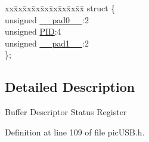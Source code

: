 \begin{DoxyCompactItemize}
\begin{tabbing}
\end{tabbing}\item 
\begin{tabbing}
xx\=xx\=xx\=xx\=xx\=xx\=xx\=xx\=xx\=\kill
struct \{\\
\>unsigned \hyperlink{union_b_d_stat_adf71f3d8410c1f1dbbc96680a92c49af}{\_\_pad0\_\_}:2\\
\>unsigned \hyperlink{union_b_d_stat_a97b41b25e06fd7857dcc6217c160a8ad}{PID}:4\\
\>unsigned \hyperlink{union_b_d_stat_acaf2d0924a107ec6e8d2e31febaf66f9}{\_\_pad1\_\_}:2\\
\}; \\

\end{tabbing}\end{DoxyCompactItemize}


\subsection{Detailed Description}
Buffer Descriptor Status Register 

Definition at line 109 of file pic\-U\-S\-B.\-h.



